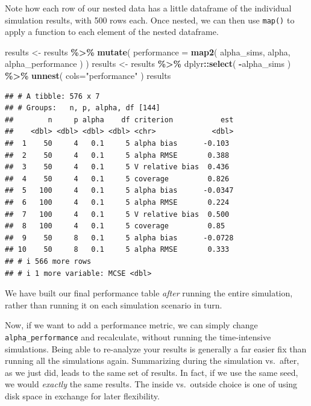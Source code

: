 \documentclass[
]{book}
\newenvironment{Shaded}{\begin{snugshade}}{\end{snugshade}}
\newcommand{\AttributeTok}[1]{\textcolor[rgb]{0.13,0.29,0.53}{#1}}
\newcommand{\FunctionTok}[1]{\textcolor[rgb]{0.13,0.29,0.53}{\textbf{#1}}}
\newcommand{\NormalTok}[1]{#1}
\newcommand{\OtherTok}[1]{\textcolor[rgb]{0.56,0.35,0.01}{#1}}
\newcommand{\SpecialCharTok}[1]{\textcolor[rgb]{0.81,0.36,0.00}{\textbf{#1}}}
\newcommand{\StringTok}[1]{\textcolor[rgb]{0.31,0.60,0.02}{#1}}
\begin{document}
Note how each row of our nested data has a little dataframe of the individual simulation results, with 500 rows each.
Once nested, we can then use \texttt{map()} to apply a function to each element of the nested dataframe.

\begin{Shaded}
\begin{Highlighting}[]
\NormalTok{results }\OtherTok{\textless{}{-}}\NormalTok{ results }\SpecialCharTok{\%\textgreater{}\%}
  \FunctionTok{mutate}\NormalTok{( }\AttributeTok{performance =} \FunctionTok{map2}\NormalTok{( alpha\_sims, alpha, }
\NormalTok{                              alpha\_performance ) )}
\NormalTok{results }\OtherTok{\textless{}{-}}\NormalTok{ results }\SpecialCharTok{\%\textgreater{}\%}
\NormalTok{  dplyr}\SpecialCharTok{::}\FunctionTok{select}\NormalTok{( }\SpecialCharTok{{-}}\NormalTok{alpha\_sims ) }\SpecialCharTok{\%\textgreater{}\%}
  \FunctionTok{unnest}\NormalTok{( }\AttributeTok{cols=}\StringTok{"performance"}\NormalTok{ ) }
\NormalTok{results}
\end{Highlighting}
\end{Shaded}

\begin{verbatim}
## # A tibble: 576 x 7
## # Groups:   n, p, alpha, df [144]
##        n     p alpha    df criterion           est
##    <dbl> <dbl> <dbl> <dbl> <chr>             <dbl>
##  1    50     4   0.1     5 alpha bias      -0.103 
##  2    50     4   0.1     5 alpha RMSE       0.388 
##  3    50     4   0.1     5 V relative bias  0.436 
##  4    50     4   0.1     5 coverage         0.826 
##  5   100     4   0.1     5 alpha bias      -0.0347
##  6   100     4   0.1     5 alpha RMSE       0.224 
##  7   100     4   0.1     5 V relative bias  0.500 
##  8   100     4   0.1     5 coverage         0.85  
##  9    50     8   0.1     5 alpha bias      -0.0728
## 10    50     8   0.1     5 alpha RMSE       0.333 
## # i 566 more rows
## # i 1 more variable: MCSE <dbl>
\end{verbatim}

We have built our final performance table \emph{after} running the entire simulation, rather than running it on each simulation scenario in turn.

Now, if we want to add a performance metric, we can simply change \texttt{alpha\_performance} and recalculate, without running the time-intensive simulations.
Being able to re-analyze your results is generally a far easier fix than running all the simulations again.
Summarizing during the simulation vs.~after, as we just did, leads to the same set of results.
In fact, if we use the same seed, we would \emph{exactly} the same results.
The inside vs.~outside choice is one of using disk space in exchange for later flexibility.
\end{document}
